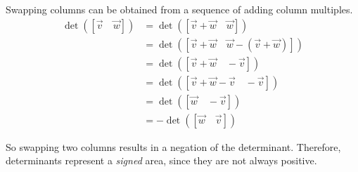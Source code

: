 \begin{applicationActivities}{1}{25}
\begin{observation}
Swapping columns can be obtained from a sequence of adding column multiples.
  \begin{align*}
  \det([\vec{v}\hspace{1em}\vec{w}])
&=
  \det([\vec{v}+\vec{w}\hspace{1em}\vec{w}])
\\ &=
  \det([\vec{v}+\vec{w}\hspace{1em}\vec{w}-(\vec{v}+\vec{w})])
\\ &=
  \det([\vec{v}+\vec{w}\hspace{1em}-\vec{v}])
\\ &=
  \det([\vec{v}+\vec{w}-\vec{v}\hspace{1em}-\vec{v}])
\\ &=
  \det([\vec{w}\hspace{1em}-\vec{v}])
\\ &=
  -\det([\vec{w}\hspace{1em}\vec{v}])
  \end{align*}
  
So swapping two columns results in a negation of the
determinant.  Therefore, determinants represent a \textit{signed} area, since they are not always
positive. 
\end{observation}




\end{applicationActivities}
